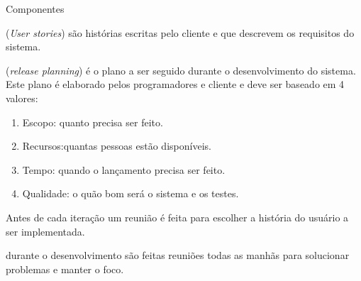 \begin{frame}{Componentes}{\insertlecture}
  \small
  \begin{description}[<+-| alert@+>]
  \item[Histórias do usuário:] ({\em User stories}) são histórias
    escritas pelo cliente e que descrevem os requisitos do sistema.
  \item[Plano de lançamento:] ({\em release planning}) é o plano a 
    ser seguido durante o desenvolvimento do sistema. Este plano é 
    elaborado pelos programadores e cliente e deve ser baseado em 4 
    valores:
    \begin{enumerate}
    \item \alert{Escopo}: quanto precisa ser feito.
    \item \alert{Recursos}:quantas pessoas estão disponíveis.
    \item \alert{Tempo}: quando o lançamento precisa ser feito.
    \item \alert{Qualidade}: o quão bom será o sistema e os testes.
    \end{enumerate}
  \item[Iteração:] Antes de cada iteração um reunião é feita para 
    escolher a história do usuário a ser implementada.
  \item[Desenvolvimento:] durante o desenvolvimento são feitas
    reuniões todas as manhãs para solucionar problemas e manter o
    foco.
  \end{description}

\end{frame}

